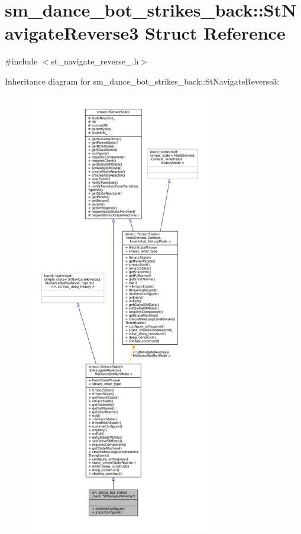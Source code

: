 \hypertarget{structsm__dance__bot__strikes__back_1_1StNavigateReverse3}{}\section{sm\+\_\+dance\+\_\+bot\+\_\+strikes\+\_\+back\+:\+:St\+Navigate\+Reverse3 Struct Reference}
\label{structsm__dance__bot__strikes__back_1_1StNavigateReverse3}


{\ttfamily \#include $<$st\+\_\+navigate\+\_\+reverse\+\_.\+h$>$}



Inheritance diagram for sm\+\_\+dance\+\_\+bot\+\_\+strikes\+\_\+back\+:\+:St\+Navigate\+Reverse3\+:
\nopagebreak
\begin{figure}[H]
\begin{center}
\leavevmode
\includegraphics[height=550pt]{structsm__dance__bot__strikes__back_1_1StNavigateReverse3__inherit__graph}
\end{center}
\end{figure}


